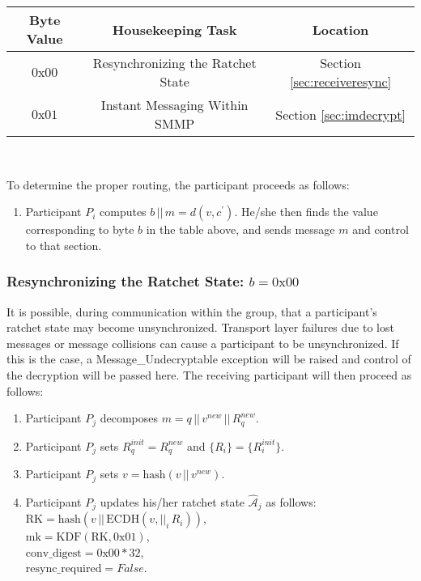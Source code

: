 \documentclass[%
preprint,
amsmath,amssymb,
aps,
prb,
floatfix,
]{revtex4-1}
\begin{document}
\begin{centering}
\begin{tabular}{|c|c|c|}
\hline
Byte Value & Housekeeping Task & Location \\
\hline
$0\mathrm{x}00$ & Resynchronizing the Ratchet State  & Section \ref{sec:receiveresync}\\
$0\mathrm{x}01$ & Instant Messaging Within SMMP & Section \ref{sec:imdecrypt}\\
\hline
\end{tabular} \\
\end{centering}
\bigskip
To determine the proper routing, the
participant proceeds as follows:
\begin{enumerate}
\item Participant $P_i$ computes $b \, || \, m = d(v, c^\prime)$. He/she then
finds the value corresponding to byte $b$ in the table above, and sends message
$m$ and control to that section.
\end{enumerate}
\subsubsection{\label{sec:receiveresync}Resynchronizing the Ratchet State: $b =
0\mathrm{x}00$}
It is possible, during communication within the group, that a participant's
ratchet state may become unsynchronized. Transport layer failures due to lost
messages or message collisions can cause a participant to be unsynchronized. If
this is the case, a Message\_Undecryptable exception will be raised
and control of the decryption will be passed here. The receiving participant
will then proceed as follows:
\begin{enumerate}
\item Participant $P_j$ decomposes $m = q \, || \, v^{new} \, || \, R_q^{new}$.
\item Participant $P_j$ sets $R_q^{init} = R_q^{new}$ and $\{R_i\} =
\{R_i^{init}\}$.
\item Participant $P_j$ sets $v = \mathrm{hash}(v \, || \, v^{new})$.
\item Participant $P_j$ updates his/her ratchet state
$\mathcal{\hat{A}}_j$ as follows:\\
$\mathrm{RK} = \mathrm{hash}(v \, || \, \mathrm{ECDH}(v, ||_i
\, R_i))$, \\
$\mathrm{mk} = \mathrm{KDF}(\mathrm{RK}, 0\mathrm{x}01)$, \\
$\mathrm{conv\_digest} = 0\mathrm{x}00 * 32$, \\
$\mathrm{resync\_required} = False$.
\end{enumerate}
\end{document}
